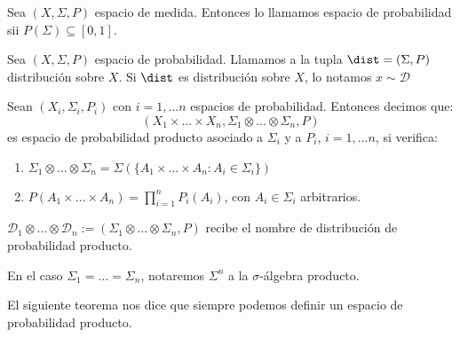 \begin{definition}
 Sea $(X, \Sigma, P)$ espacio de medida. Entonces lo llamamos espacio de probabilidad sii $P(\Sigma)\subseteq [0,1]$.
\end{definition}


\begin{definition}
 Sea $(X, \Sigma, P)$ espacio de probabilidad. Llamamos a la tupla $\dist = (\Sigma,P)$ distribución sobre $X$. 
 Si $\dist$ es distribución sobre $X$, lo notamos $x\sim \mathcal{D}$
\end{definition}

\begin{definition}
 Sean $(X_i, \Sigma_i, P_i)$ con $i=1,\ldots n$ espacios de probabilidad. Entonces decimos que:
 \[(X_1 \times \ldots \times X_n, \Sigma_1 \otimes \ldots \otimes \Sigma_n, P)\] es
 espacio de probabilidad producto asociado a $\Sigma_i$ y a $P_i$, $i=1, \ldots n$, si verifica:
 
 \begin{enumerate}[i]
  \item $\Sigma_1 \otimes \ldots \otimes \Sigma_n = \Sigma\left(\{A_1 \times \ldots \times A_n: A_i\in \Sigma_i\}\right)$
  \item $P(A_1 \times \ldots \times A_n) = \prod_{i=1}^n P_i(A_i)$, con $A_i\in \Sigma_i$ arbitrarios.
 \end{enumerate}
 
 $\mathcal{D}_1 \otimes \ldots \otimes \mathcal{D}_n := (\Sigma_1 \otimes \ldots \otimes \Sigma_n, P)$ recibe 
 el nombre de distribución de probabilidad producto.
 
 En el caso $\Sigma_1 = \ldots = \Sigma_n$, notaremos $\Sigma^n$ a la $\sigma$-álgebra producto.
\end{definition}

El siguiente teorema nos dice que siempre podemos definir un espacio de probabilidad producto.

